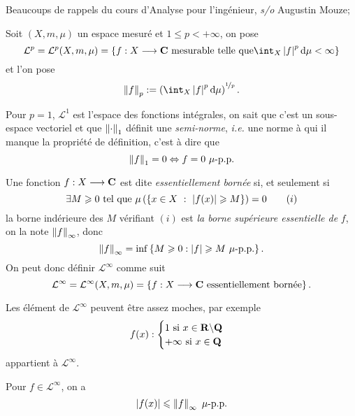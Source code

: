 \documentclass[a4paper,11pt, twoside]{article}
\begin{document}


Beaucoups de rappels du cours d'Analyse pour l'ingénieur, \emph{s/o} Augustin Mouze;


\begin{Def}
  Soit $(X,m,\mu)$ un espace mesuré et $1\leqslant p<+\infty$, on pose 
$$\mathcal L^p=\mathcal L^p(X,m,\mu)=\ens{f:X\longrightarrow\C\text{ mesurable telle que}\int_X\abs{f}^p\mathrm d\mu<\infty}$$
et l'on pose 
$$\norm{f}_p:=\left(\int_X\abs{f}^p\mathrm d\mu\right)^{\nicefrac{1}{p}}.$$
\end{Def}


\begin{RQ}
  Pour $p=1$, $\mathcal L^1$ est l'espace des fonctions intégrales, on sait que c'est un sous-espace vectoriel et que $\left\lVert\cdot\right\rVert_1$ définit une \emph{semi-norme}, \emph{i.e.} une norme à qui il manque la propriété de définition, c'est à dire que 
$$\norm{f}_1=0\Leftrightarrow f=0\ \mu\text{-p.p.}$$
\end{RQ}

\begin{Def}
  Une fonction $f:X\longrightarrow\mathbf C$ est dite \emph{essentiellement bornée} si, et seulement si 
$$\exists M\geqslant 0\text{ tel que }\mu\left(\left\{x\in X\ :\ \left| f(x)\right|\geqslant M\right\}\right)=0\qquad (i)$$
la borne indérieure des $M$ vérifiant $(i)$ est \emph{la borne supérieure essentielle de }$f$, on la note $\left\lVert f\right\rVert_{\infty}$, donc 
$$\left\lVert f\right\rVert_\infty=\mathrm{inf}\left\{M\geqslant 0 : \left| f\right|\geqslant M\ \mu\text{-p.p.}\right\}.$$
On peut donc définir $\mathcal L^\infty$ comme suit
$$\mathcal L^\infty=\mathcal L^\infty(X,m,\mu)=\left\{f:X\longrightarrow\mathbf C\text{ essentiellement bornée}\right\}.$$
\end{Def}


\begin{RQ}
Les élément de $\mathcal L^\infty$ peuvent être assez moches, par exemple 
$$f(x):\begin{cases}
  1\text{ si }x\in\mathbf R\backslash\mathbf Q\\
  +\infty\text{ si }x\in\mathbf Q
\end{cases}$$
appartient à $\mathcal L^\infty$.
\end{RQ}


\begin{RQ}
  Pour $f\in\mathcal L^\infty$, on a 
  $$\abs{f(x)}\leqslant \norm{f}_\infty\ \mu\text{-p.p.}$$
\end{RQ}
\end{document}
